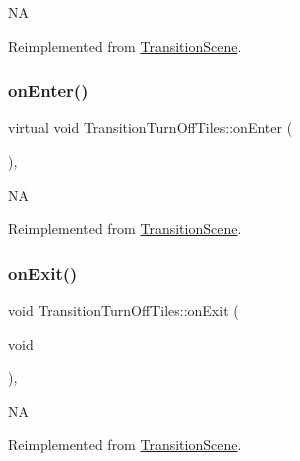 NA 

Reimplemented from \hyperlink{classTransitionScene_aace390a1bd8f3c73bb650a1e256a0f83}{Transition\+Scene}.

\mbox{\label{classTransitionTurnOffTiles_aa32c923595c2e6c212c16f07958cc72b}} 
\subsubsection{\texorpdfstring{on\+Enter()}{onEnter()}\hspace{0.1cm}{\footnotesize\ttfamily [2/2]}}
{\footnotesize\ttfamily virtual void Transition\+Turn\+Off\+Tiles\+::on\+Enter (\begin{DoxyParamCaption}{ }\end{DoxyParamCaption})\hspace{0.3cm}{\ttfamily [override]}, {\ttfamily [virtual]}}

NA 

Reimplemented from \hyperlink{classTransitionScene_aace390a1bd8f3c73bb650a1e256a0f83}{Transition\+Scene}.

\mbox{\label{classTransitionTurnOffTiles_ad178c23408dd18b341e043ae5d645499}} 
\subsubsection{\texorpdfstring{on\+Exit()}{onExit()}\hspace{0.1cm}{\footnotesize\ttfamily [1/2]}}
{\footnotesize\ttfamily void Transition\+Turn\+Off\+Tiles\+::on\+Exit (\begin{DoxyParamCaption}\item[{void}]{ }\end{DoxyParamCaption})\hspace{0.3cm}{\ttfamily [override]}, {\ttfamily [virtual]}}

NA 

Reimplemented from \hyperlink{classTransitionScene_a45e39b658189c79428a05c3bc3173bbb}{Transition\+Scene}.

\mbox{\label{classTransitionTurnOffTiles_a690a28870ab7e338aa4645134869f520}} 
